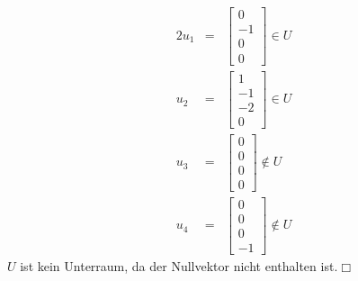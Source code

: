 \documentclass[10pt,a4paper,oneside,ngerman,numbers=noenddot]{scrartcl}
\begin{document}
\subsection{} %
\begin{alignat*}{2}
u_{1} &=& \begin{bmatrix}
0 \\
-1 \\
0 \\
0
\end{bmatrix} \in U \\
u_{2} &=& \begin{bmatrix}
1 \\
-1 \\
-2 \\
0
\end{bmatrix} \in U \\
u_{3} &=& \begin{bmatrix}
0 \\
0 \\
0 \\
0
\end{bmatrix} \not\in U \\
u_{4} &=& \begin{bmatrix}
0 \\
0 \\
0 \\
-1
\end{bmatrix} \not\in U
\end{alignat*}
$U$ ist kein Unterraum, da der Nullvektor nicht enthalten ist.\hfill $\Box$
\section{} %
\end{document}
